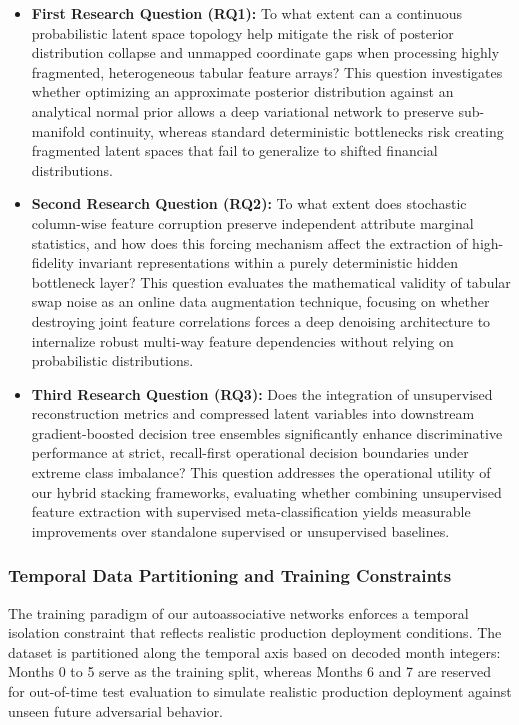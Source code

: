 \begin{itemize}[leftmargin=2em]
    \item \textbf{First Research Question (RQ1):} To what extent can a continuous probabilistic latent space topology help mitigate the risk of posterior distribution collapse and unmapped coordinate gaps when processing highly fragmented, heterogeneous tabular feature arrays? This question investigates whether optimizing an approximate posterior distribution against an analytical normal prior allows a deep variational network to preserve sub-manifold continuity, whereas standard deterministic bottlenecks risk creating fragmented latent spaces that fail to generalize to shifted financial distributions.

    \item \textbf{Second Research Question (RQ2):} To what extent does stochastic column-wise feature corruption preserve independent attribute marginal statistics, and how does this forcing mechanism affect the extraction of high-fidelity invariant representations within a purely deterministic hidden bottleneck layer? This question evaluates the mathematical validity of tabular swap noise as an online data augmentation technique, focusing on whether destroying joint feature correlations forces a deep denoising architecture to internalize robust multi-way feature dependencies without relying on probabilistic distributions.

    \item \textbf{Third Research Question (RQ3):} Does the integration of unsupervised reconstruction metrics and compressed latent variables into downstream gradient-boosted decision tree ensembles significantly enhance discriminative performance at strict, recall-first operational decision boundaries under extreme class imbalance? This question addresses the operational utility of our hybrid stacking frameworks, evaluating whether combining unsupervised feature extraction with supervised meta-classification yields measurable improvements over standalone supervised or unsupervised baselines.
\end{itemize}

\subsubsection{Temporal Data Partitioning and Training Constraints}

The training paradigm of our autoassociative networks enforces a temporal isolation constraint that reflects realistic production deployment conditions. The dataset is partitioned along the temporal axis based on decoded month integers: Months 0 to 5 serve as the training split, whereas Months 6 and 7 are reserved for out-of-time test evaluation to simulate realistic production deployment against unseen future adversarial behavior.

